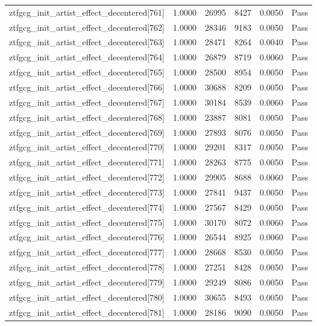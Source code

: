 \begin{table}[htbp]
\begin{tabular}{llrrll}
ztfgcg\_init\_artist\_effect\_decentered[761] & 1.0000 & 26995 & 8427 & 0.0050 & Pass \\
ztfgcg\_init\_artist\_effect\_decentered[762] & 1.0000 & 28346 & 9183 & 0.0050 & Pass \\
ztfgcg\_init\_artist\_effect\_decentered[763] & 1.0000 & 28471 & 8264 & 0.0040 & Pass \\
ztfgcg\_init\_artist\_effect\_decentered[764] & 1.0000 & 26879 & 8719 & 0.0060 & Pass \\
ztfgcg\_init\_artist\_effect\_decentered[765] & 1.0000 & 28500 & 8954 & 0.0050 & Pass \\
ztfgcg\_init\_artist\_effect\_decentered[766] & 1.0000 & 30688 & 8209 & 0.0050 & Pass \\
ztfgcg\_init\_artist\_effect\_decentered[767] & 1.0000 & 30184 & 8539 & 0.0060 & Pass \\
ztfgcg\_init\_artist\_effect\_decentered[768] & 1.0000 & 23887 & 8081 & 0.0050 & Pass \\
ztfgcg\_init\_artist\_effect\_decentered[769] & 1.0000 & 27893 & 8076 & 0.0050 & Pass \\
ztfgcg\_init\_artist\_effect\_decentered[770] & 1.0000 & 29201 & 8317 & 0.0050 & Pass \\
ztfgcg\_init\_artist\_effect\_decentered[771] & 1.0000 & 28263 & 8775 & 0.0050 & Pass \\
ztfgcg\_init\_artist\_effect\_decentered[772] & 1.0000 & 29905 & 8688 & 0.0060 & Pass \\
ztfgcg\_init\_artist\_effect\_decentered[773] & 1.0000 & 27841 & 9437 & 0.0050 & Pass \\
ztfgcg\_init\_artist\_effect\_decentered[774] & 1.0000 & 27567 & 8429 & 0.0050 & Pass \\
ztfgcg\_init\_artist\_effect\_decentered[775] & 1.0000 & 30170 & 8072 & 0.0060 & Pass \\
ztfgcg\_init\_artist\_effect\_decentered[776] & 1.0000 & 26544 & 8925 & 0.0060 & Pass \\
ztfgcg\_init\_artist\_effect\_decentered[777] & 1.0000 & 28668 & 8530 & 0.0050 & Pass \\
ztfgcg\_init\_artist\_effect\_decentered[778] & 1.0000 & 27251 & 8428 & 0.0050 & Pass \\
ztfgcg\_init\_artist\_effect\_decentered[779] & 1.0000 & 29249 & 8086 & 0.0050 & Pass \\
ztfgcg\_init\_artist\_effect\_decentered[780] & 1.0000 & 30655 & 8493 & 0.0050 & Pass \\
ztfgcg\_init\_artist\_effect\_decentered[781] & 1.0000 & 28186 & 9090 & 0.0050 & Pass \\

\end{tabular}
\end{table}
